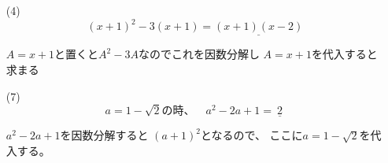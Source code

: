 \documentclass[12pt,b5paper]{ltjsarticle}
\begin{document}
\begin{itemize}
 \item[(4)]
           \begin{equation}
            (x+1)^2-3(x+1) = \underline{(x+1)(x-2)}
           \end{equation}


           $A=x+1$と置くと$A^2-3A$なのでこれを因数分解し
           $A=x+1$を代入すると求まる

 \item[(7)]
           \begin{equation}
            a=1-\sqrt{2}の時、 \quad a^2-2a+1 = \underline{\ 2\ }
           \end{equation}


           $a^2-2a+1$を因数分解すると
           $(a+1)^2$となるので、
           ここに$a=1-\sqrt{2}$を代入する。
\end{itemize}
\end{document}

